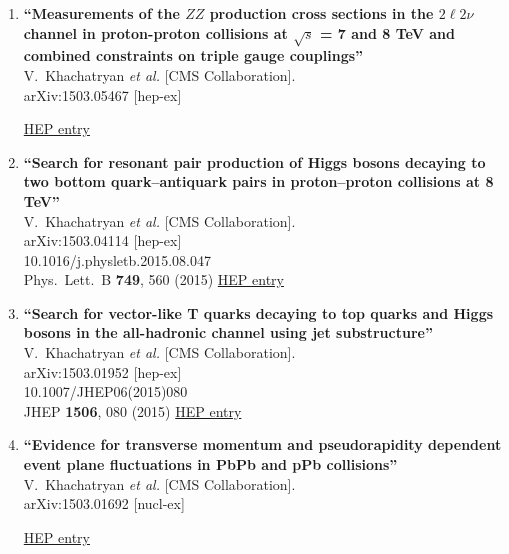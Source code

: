 \documentclass{article}
\begin{document}
\begin{enumerate}
\item%
{\bf ``Measurements of the $ZZ$ production cross sections in the $2\ell2\nu$ channel in proton-proton collisions at $\sqrt{s}$ = 7 and 8 TeV and combined constraints on triple gauge couplings''}
  \\{}V.~Khachatryan {\it et al.} [CMS Collaboration].
  \\{}arXiv:1503.05467 [hep-ex]
  
\href{http://inspirehep.net/record/1353393}{HEP entry}


\item%
{\bf ``Search for resonant pair production of Higgs bosons decaying to two bottom quark–antiquark pairs in proton–proton collisions at 8 TeV''}
  \\{}V.~Khachatryan {\it et al.} [CMS Collaboration].
  \\{}arXiv:1503.04114 [hep-ex]
    \\{}10.1016/j.physletb.2015.08.047
\\{}Phys.\ Lett.\ B {\bf 749}, 560 (2015) %
\href{http://inspirehep.net/record/1352128}{HEP entry}


\item%
{\bf ``Search for vector-like T quarks decaying to top quarks and Higgs bosons in the all-hadronic channel using jet substructure''}
  \\{}V.~Khachatryan {\it et al.} [CMS Collaboration].
  \\{}arXiv:1503.01952 [hep-ex]
    \\{}10.1007/JHEP06(2015)080
\\{}JHEP {\bf 1506}, 080 (2015) %
\href{http://inspirehep.net/record/1348542}{HEP entry}


\item%
{\bf ``Evidence for transverse momentum and pseudorapidity dependent event plane fluctuations in PbPb and pPb collisions''}
  \\{}V.~Khachatryan {\it et al.} [CMS Collaboration].
  \\{}arXiv:1503.01692 [nucl-ex]
  
\href{http://inspirehep.net/record/1347386}{HEP entry}



\end{enumerate}
\end{document}
